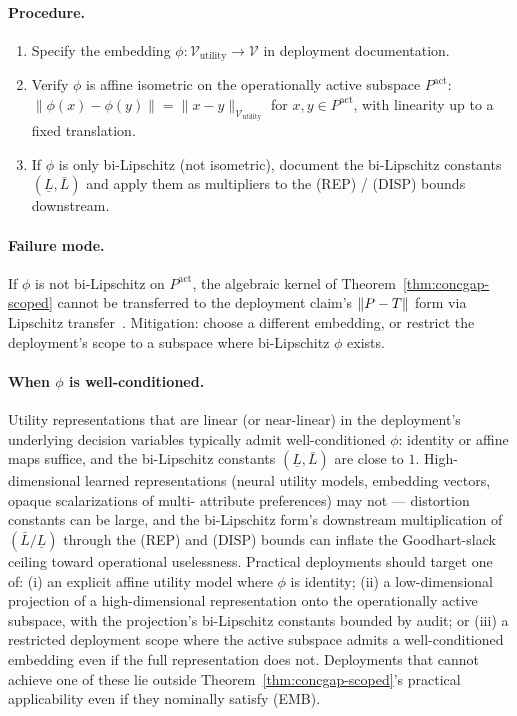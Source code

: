 \paragraph{Procedure.}
\begin{enumerate}
\item Specify the embedding $\phi: \mathcal{V}_\mathrm{utility}
  \to \mathcal{V}$ in deployment documentation.
\item Verify $\phi$ is affine isometric on the operationally
  active subspace $P^\mathrm{act}$: $\|\phi(x) - \phi(y)\| =
  \|x - y\|_{\mathcal{V}_\mathrm{utility}}$ for $x, y \in
  P^\mathrm{act}$, with linearity up to a fixed translation.
\item If $\phi$ is only bi-Lipschitz (not isometric), document
  the bi-Lipschitz constants $(\underline{L}, \bar{L})$ and apply
  them as multipliers to the (REP) / (DISP) bounds downstream.
\end{enumerate}

\paragraph{Failure mode.} If $\phi$ is not bi-Lipschitz on
$P^\mathrm{act}$, the algebraic kernel of
Theorem~\ref{thm:concgap-scoped} cannot be transferred to the
deployment claim's $\|P - T\|$ form via
Lipschitz transfer~\citep[Theorem~2]{lasser2026micro}. Mitigation:
choose a different embedding, or restrict the deployment's scope
to a subspace where bi-Lipschitz $\phi$ exists.

\paragraph{When $\phi$ is well-conditioned.}
Utility representations that are linear (or near-linear) in the
deployment's underlying decision variables typically admit
well-conditioned $\phi$: identity or affine maps suffice, and the
bi-Lipschitz constants $(\underline{L}, \bar{L})$ are close to
$1$. High-dimensional learned representations (neural utility
models, embedding vectors, opaque scalarizations of multi-
attribute preferences) may not --- distortion constants can be
large, and the bi-Lipschitz form's downstream multiplication of
$(\bar{L}/\underline{L})$ through the (REP) and (DISP) bounds
can inflate the Goodhart-slack ceiling toward operational
uselessness. Practical deployments should target one of: (i) an
explicit affine utility model where $\phi$ is identity; (ii) a
low-dimensional projection of a high-dimensional representation
onto the operationally active subspace, with the projection's
bi-Lipschitz constants bounded by audit; or (iii) a restricted
deployment scope where the active subspace admits a
well-conditioned embedding even if the full representation does
not. Deployments that cannot achieve one of these lie outside
Theorem~\ref{thm:concgap-scoped}'s practical applicability even
if they nominally satisfy (EMB).

